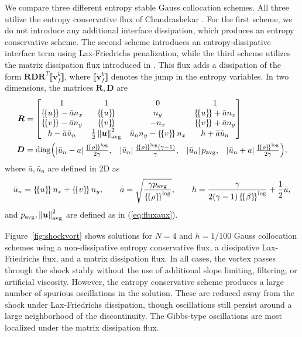 \documentclass[review,onefignum,onetabnum,final]{siamart171218}
\newcommand{\nor}[1]{\left\| #1 \right\|}
\newcommand{\LRb}[1]{\left| #1 \right|}
\newcommand{\LRc}[1]{\left\{ #1 \right\}}
\newcommand{\jump}[1] {\ensuremath{\llbracket#1\rrbracket}}
\newcommand{\avg}[1] {\ensuremath{\LRc{\!\{#1\}\!}}}
\begin{document}
We compare three different entropy stable Gauss collocation schemes.  All three utilize the entropy conservative flux of Chandrashekar \cite{chandrashekar2013kinetic}.  For the first scheme, we do not introduce any additional interface dissipation, which produces an entropy conservative scheme.  The second scheme introduces an entropy-dissipative interface term using Lax-Friedrichs penalization, while the third scheme utilizes the matrix dissipation flux introduced in \cite{winters2017uniquely}.  This flux adds a dissipation of the form $\bm{R}\bm{D}\bm{R}^T\jump{{\bm{v}}^k_f}$, where $\jump{{\bm{v}}^k_f}$ denotes the jump in the entropy variables.  In two dimensions, the matrices $\bm{R}, \bm{D}$ are 
\begin{align*}
\bm{R} &= \begin{bmatrix}
1 & 1 & 0 & 1\\
\avg{u}-\bar{a} n_x & \avg{u} & n_y & \avg{u}+\bar{a} n_x\\
\avg{v}-\bar{a} n_y & \avg{v} & -n_x & \avg{v}+\bar{a} n_y\\
h-\bar{a} \bar{u}_n & \frac{1}{2}\nor{\bm{u}}^2_{\rm avg} & \bar{u}_n n_y - \avg{v}n_x & h + \bar{a} \bar{u}_n
\end{bmatrix}\\
\bm{D} &= {\rm diag}{\begin{pmatrix}
\LRb{\bar{u}_n - a}\frac{\avg{\rho}^{\log}}{2\gamma}, & \LRb{\bar{u}_n}\frac{\avg{\rho}^{\log}(\gamma-1)}{\gamma}, & \LRb{\bar{u}_n}p_{\rm avg}, & \LRb{\bar{u}_n + a}\frac{\avg{\rho}^{\log}}{2\gamma} \end{pmatrix}},
\end{align*}
where $\bar{a}, \bar{u}_n$ are defined in 2D as
\begin{gather*}
\bar{u}_n = \avg{u}n_x + \avg{v}n_y, \qquad \bar{a} = \sqrt{\frac{\gamma p_{\rm avg}}{\avg{\rho}^{\log}}}, \qquad h = \frac{\gamma}{2(\gamma-1)\avg{\beta}^{\log}} + \frac{1}{2}\bar{u}, 
\end{gather*}
and $p_{\rm avg}, \nor{\bm{u}}^2_{\rm avg}$ are defined as in (\ref{eq:fluxaux}).  

Figure~\ref{fig:shockvort} shows solutions for $N=4$ and $h = 1/100$ Gauss collocation schemes using a non-dissipative entropy conservative flux, a dissipative Lax-Friedrichs flux, and a matrix dissipation flux.  In all cases, the vortex passes through the shock stably without the use of additional slope limiting, filtering, or artificial viscosity.  However, the entropy conservative scheme produces a large number of spurious oscillations in the solution.  These are reduced away from the shock under Lax-Friedrichs dissipation, though oscillations still persist around a large neighborhood of the discontinuity.  The Gibbs-type oscillations are most localized under the matrix dissipation flux.  
\end{document}
